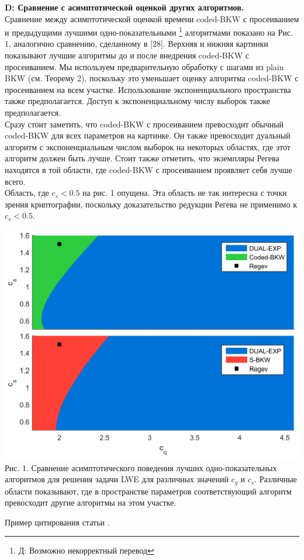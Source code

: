 \documentclass[a4paper,11pt]{article}
\begin{document}
\textbf{D: Сравнение с асимптотической оценкой других алгоритмов.}\\

Сравнение между асимптотической оценкой времени coded-BKW с просеиванием и предыдущими лучшими одно-показательными \footnote{Д: Возможно некорректный перевод} алгоритмами показано на Рис. 1, аналогично сравнению, сделанному в [28]. Верхняя и нижняя картинки показывают лучшие алгоритмы до и после внедрения coded-BKW с просеиванием. Мы используем предварительную обработку с шагами из plain BKW (см. Теорему 2), поскольку это уменьшает оценку алгоритма coded-BKW с просеиванием на всем участке. Использование экспоненциального пространства также предполагается. Доступ к экспоненциальному числу выборок также предполагается.\\
Сразу стоит заметить, что coded-BKW с просеиванием превосходит обычный coded-BKW для всех параметров на картинке. Он также превосходит дуальный алгоритм с экспоненциальным числом выборок на некоторых областях, где этот алгоритм должен быть лучше. Стоит также отметить, что экземпляры Регева находятся в той области, где coded-BKW с просеиванием проявляет себя лучше всего.\\
Область, где $c_s < 0.5$ на рис. 1 опущена. Эта область не так интересна с точки зрения криптографии, поскольку доказательство редукции Регева не применимо к $c_s < 0.5$.\\

\begin{center}
\includegraphics[scale=0.5]{1.png}\\
Рис. 1. Сравнение асимптотического поведения лучших одно-показательных алгоритмов для решения задачи LWE для различных значений $c_q$ и $c_s$. Различные области показывают, где в пространстве параметров соответствующий алгоритм превосходит другие алгоритмы на этом участке.
\end{center}

Пример цитирования статьи \cite{KF15}.



\def\shortbib{1}


\end{document}
